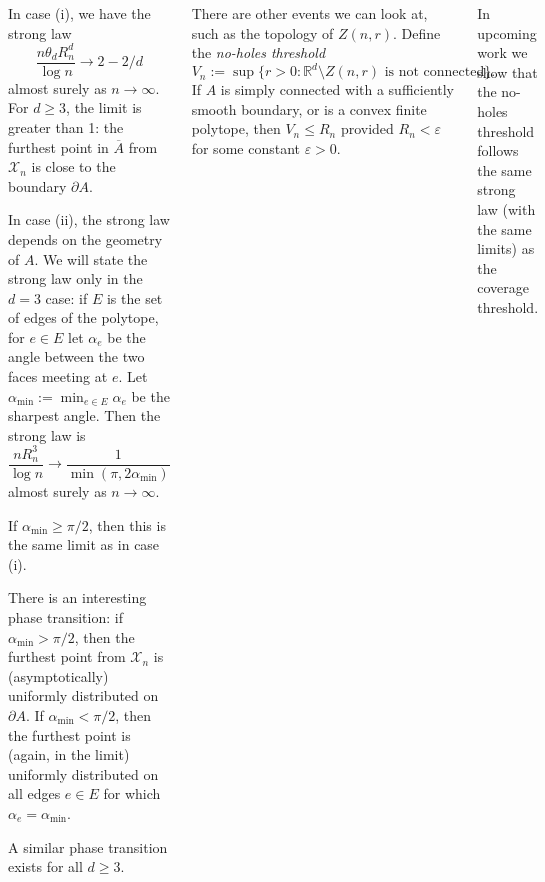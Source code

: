 \documentclass{tikzposter} %
\def\R{\mathbb{R}}
\def\eps{\varepsilon}
\begin{document}
\begin{columns}
\begin{subcolumns}
{	In case (i), we have the strong law
	\[
		\frac{n \theta_d R_n^d}{\log n} \to 2 - 2/d
	\]
	almost surely as $n \to \infty$.
	For $d \geq 3$, the limit is greater than 1:
	the furthest point in $\overline{A}$ from $\mathcal{X}_n$
	is close to the boundary $\partial A$.
	
	In case (ii), the strong law \cite{euclidean-coverage}
	 depends on the geometry of $A$.
	We will state the strong law only in the $d = 3$ case:
	if $E$ is the set of edges of the polytope,
	for $e \in E$ let $\alpha_e$ be the angle between the two faces meeting at $e$.
	Let $\alpha_{\mathrm{min}} := \min_{e \in E} \alpha_e$
	be the sharpest angle.
	Then the strong law is
	\[
		\frac{n R_n^3}{\log n} \to \frac{1}{
			\min( \pi, 2 \alpha_{\mathrm{min}} )
		}
	\]
	almost surely as $n \to \infty$.
	
	If $\alpha_{\mathrm{min}} \geq \pi/2$,
	then this is the same limit as in case (i).
	
	There is an interesting phase transition:
	if $\alpha_{\mathrm{min}} > \pi/2$,
	then the furthest point from $\mathcal{X}_n$
	is (asymptotically) uniformly distributed on $\partial A$.
	If $\alpha_{\mathrm{min}} < \pi/2$,
	then the furthest point is (again, in the limit) uniformly distributed
	on all edges $e \in E$ for which $\alpha_e = \alpha_{\mathrm{min}}$.
	
	A similar phase transition exists for all $d \geq 3$.
}
\end{subcolumns}



{
	There are other events we can look at,
	such as the topology of $Z(n,r)$.
	Define the \emph{no-holes threshold}
	\[
		V_n := \sup\{ r > 0 : \R^d \setminus Z(n,r) \text{ is not connected} \}.
	\]
	If $A$ is simply connected with a sufficiently smooth boundary,
	or is a convex finite polytope, then $V_n \leq R_n$
	provided $R_n < \eps$ for some constant $\eps > 0$.
	
	In upcoming work we show that the no-holes threshold
	follows the same strong law (with the same limits)
	as the coverage threshold.
}

\end{columns}
\end{document}
